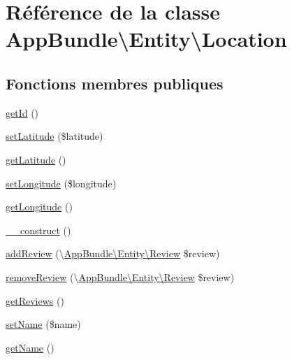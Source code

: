 \hypertarget{classAppBundle_1_1Entity_1_1Location}{}\section{Référence de la classe App\+Bundle\textbackslash{}Entity\textbackslash{}Location}
\label{classAppBundle_1_1Entity_1_1Location}
\subsection*{Fonctions membres publiques}
\begin{DoxyCompactItemize}
\item 
\hyperlink{classAppBundle_1_1Entity_1_1Location_a40cd226faaa21283918bcbebfb8d9729}{get\+Id} ()
\item 
\hyperlink{classAppBundle_1_1Entity_1_1Location_aec02b0397a895b43863dc95118eca59d}{set\+Latitude} (\$latitude)
\item 
\hyperlink{classAppBundle_1_1Entity_1_1Location_a03576959d91ad5db3071a2b28430ca59}{get\+Latitude} ()
\item 
\hyperlink{classAppBundle_1_1Entity_1_1Location_a0591ba9da720d3334013549916c3347b}{set\+Longitude} (\$longitude)
\item 
\hyperlink{classAppBundle_1_1Entity_1_1Location_a5af4e443cb4e99ed95981276f451450b}{get\+Longitude} ()
\item 
\hyperlink{classAppBundle_1_1Entity_1_1Location_aaee06ec64eadc141b27c883faab92552}{\+\_\+\+\_\+construct} ()
\item 
\hyperlink{classAppBundle_1_1Entity_1_1Location_a49b47d7c0be25471d81d1ae3e31ba448}{add\+Review} (\textbackslash{}\hyperlink{classAppBundle_1_1Entity_1_1Review}{App\+Bundle\textbackslash{}\+Entity\textbackslash{}\+Review} \$review)
\item 
\hyperlink{classAppBundle_1_1Entity_1_1Location_a42339fbc46751d310a10c650b8b4d797}{remove\+Review} (\textbackslash{}\hyperlink{classAppBundle_1_1Entity_1_1Review}{App\+Bundle\textbackslash{}\+Entity\textbackslash{}\+Review} \$review)
\item 
\hyperlink{classAppBundle_1_1Entity_1_1Location_a6a8cdadd950886f414ea7c456e8e4a5e}{get\+Reviews} ()
\item 
\hyperlink{classAppBundle_1_1Entity_1_1Location_a9a0d9075d1a1fa5e2efea262412045d0}{set\+Name} (\$name)
\item 
\hyperlink{classAppBundle_1_1Entity_1_1Location_af45b7253351a49a59704ff76bf65d945}{get\+Name} ()
\end{DoxyCompactItemize}


